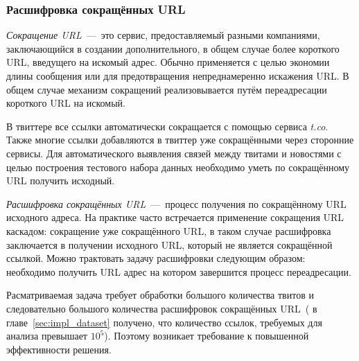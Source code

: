     \subsubsection{Расшифровка сокращённых URL}
        \textit{Сокращение URL}~---~это сервис, предоставляемый разными компаниями, заключающийся в создании дополнительного, в общем случае более короткого URL, введущего на искомый адрес.
        Обычно применяется с целью экономии длины сообщения или для предотвращения непреднамеренно искажения URL.
        В общем случае механизм сокращений реализовывается путём переадресации короткого URL на искомый.

        В твиттере все ссылки автоматически сокращается с помощью сервиса \textit{t.co}. Также многие ссылки добавляются в твиттер уже сокращёнными через сторонние сервисы.
        Для автоматического выявления связей между твитами и новостями с целью построения тестового набора данных необходимо уметь по сокращённому URL получить исходный.

        \textit{Расшифровка сокращённых URL}~---~процесс получения по сокращённому URL исходного адреса.
        На практике часто встречается применение сокращения URL каскадом: сокращение уже сокращённого URL,
        в таком случае расшифровка заключается в получении исходного URL, который не является сокращённой ссылкой.
        Можно трактовать задачу расшифровки следующим образом: необходимо получить URL адрес на котором завершится процесс переадресации.

        Расматриваемая задача требует обработки большого количества твитов и следовательно большого количества расшифровок сокращённых URL~(
        в главе~\ref{sec:impl_dataset} получено, что количество ссылок, требуемых для анализа превышает $10^5$).
        Поэтому возникает требование к повышенной эффективности решения.

